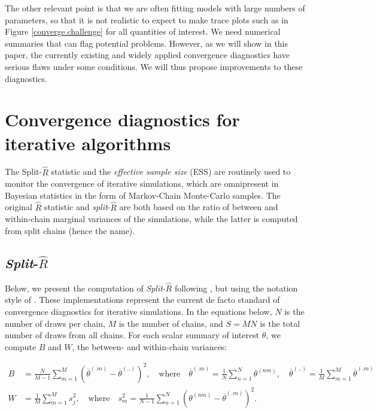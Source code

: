 \documentclass[american,]{article}
\begin{document}
The other relevant point is that we are often fitting models with large
numbers of parameters, so that it is not realistic to expect to make
trace plots such as in Figure \ref{converge.challenge} for all
quantities of interest. We need numerical summaries that can flag
potential problems. However, as we will show in this paper, the
currently existing and widely applied convergence diagnostics have
serious flaws under some conditions. We will thus propose improvements
to these diagnostics.

\hypertarget{CD}{%
\section{Convergence diagnostics for iterative algorithms}\label{CD}}

The Split-\(\widehat{R}\) statistic and the \emph{effective sample size}
(ESS) are routinely used to monitor the convergence of iterative
simulations, which are omnipresent in Bayesian statistics in the form of
Markov-Chain Monte-Carlo samples. The original \(\widehat{R}\) statistic
\citep{Gelman+Rubin:1992, Brooks+Gelman:1998} and
\emph{split}-\(\widehat{R}\) \citep{BDA3} are both based on the ratio of
between and within-chain marginal variances of the simulations, while
the latter is computed from split chains (hence the name).

\hypertarget{SplitRhat}{%
\subsection{\texorpdfstring{\emph{Split}-\(\widehat{R}\)}{Split-\textbackslash{}widehat\{R\}}}\label{SplitRhat}}

Below, we present the computation of \emph{Split}-\(\widehat{R}\)
following \citet{BDA3}, but using the notation style of
\citet{StanBook}. These implementations represent the current de facto
standard of convergence diagnostics for iterative simulations. In the
equations below, \(N\) is the number of draws per chain, \(M\) is the
number of chains, and \(S=MN\) is the total number of draws from all
chains. For each scalar summary of interest \(\theta\), we compute \(B\)
and \(W\), the between- and within-chain variances:

\begin{align}
B &= \frac{N}{M-1}\sum_{m=1}^{M}(\overline{\theta}^{(.m)} - 
\overline{\theta}^{(..)})^2, \quad \mbox{where} \quad 
\overline{\theta}^{(.m)}=\frac{1}{N}\sum_{n=1}^N \theta^{(nm)}, \quad
\overline{\theta}^{(..)} = \frac{1}{M}\sum_{m=1}^M\overline{\theta}^{(.m)} 
\\
W &= \frac{1}{M}\sum_{m=1}^{M}s_j^2, \quad \mbox{where} \quad
s_m^2=\frac{1}{N-1} \sum_{n=1}^N (\theta^{(nm)}-\overline{\theta}^{(.m)})^2.
\end{align}
\end{document}
